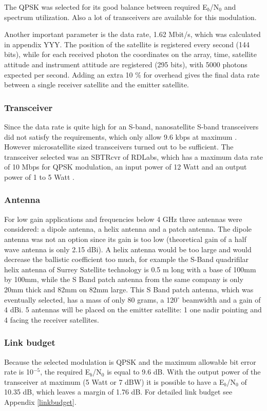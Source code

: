 The QPSK was selected for its good balance between required E$_{b}$/N$_{0}$ and spectrum utilization. Also a lot of transceivers are available for this modulation.

Another important parameter is the data rate, 1.62 Mbit/s, which was calculated in appendix YYY. The position of the satellite is registered every second (144 bits), while for each received photon the coordinates on the array, time, satellite attitude and instrument attitude are registered (295 bits), with 5000 photons expected per second. Adding an extra 10 \% for overhead gives the final data rate between a single receiver satellite and the emitter satellite.


\subsubsection{Transceiver}
Since the data rate is quite high for an S-band, nanosatellite S-band transceivers did not satisfy the requirements, which only allow 9.6 kbps at maximum \cite{cubeshopcomm}. However microsatellite sized transceivers turned out to be sufficient. The transceiver selected was an SBTRcvr of RDLabs, which has a maximum data rate of 10 Mbps for QPSK modulation, an input power of 12 Watt and an output power of 1 to 5 Watt \cite{RDLabs}.

\subsubsection{Antenna}
For low gain applications and frequencies below 4 GHz three antennas were considered: a dipole antenna, a helix antenna and a patch antenna. The dipole antenna was not an option since its gain is too low (theoretical gain of a half wave antenna is only 2.15 dBi). A helix antenna would be too large and would decrease the ballistic coefficient too much, for example the S-Band quadrifilar helix antenna of Surrey Satellite technology \cite{SurrHelix} is 0.5 m long with a base of 100mm by 100mm, while the S Band patch antenna \cite{SurrPatch} from the same company is only 20mm thick and 82mm on 82mm large. 
This S Band patch antenna, which was eventually selected, has a mass of only 80 grams, a 120$^{\circ}$ beamwidth and a gain of 4 dBi.
5 antennas will be placed on the emitter satellite: 1 one nadir pointing and 4 facing the receiver satellites.

\subsubsection{Link budget}
Because the selected modulation is QPSK and the maximum allowable bit error rate is 10$^{-5}$, the required E$_{b}$/N$_{0}$ is equal to 9.6 dB. With the output power of the transceiver at maximum (5 Watt or 7 dBW) it is possible to have a E$_{b}$/N$_{0}$ of 10.35 dB, which leaves a margin of 1.76 dB. For detailed link budget see Appendix \ref{linkbudget}.

